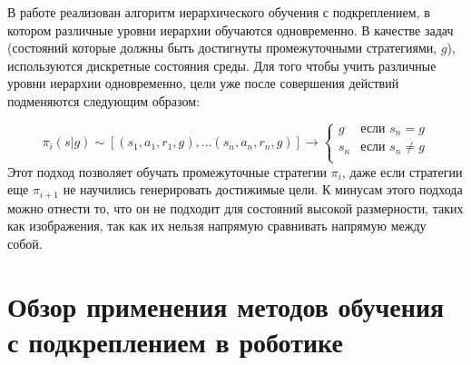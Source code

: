 В работе \cite{levy2017learning} реализован алгоритм иерархического обучения с подкреплением, в котором различные уровни иерархии обучаются одновременно. В качестве задач (состояний которые должны быть достигнуты промежуточными стратегиями, $g$), используются дискретные состояния среды. Для того чтобы учить различные уровни иерархии одновременно, цели уже после совершения действий подменяются следующим образом: 

\begin{equation}
    \pi_i(s|g) \sim [(s_1,a_1,r_1,g), \ldots (s_n,a_n,r_n,g)] \to \begin{cases}
        g & \text{если $s_n = g$}\\
        s_n & \text{если $s_n \neq g$}\\
    \end{cases}
\end{equation}
Этот подход позволяет обучать промежуточные стратегии $\pi_i$, даже если стратегии еще $\pi_{i+1}$ не научились генерировать достижимые цели. К минусам этого подхода можно отнести то, что он не подходит для состояний высокой размерности, таких как изображения, так как их нельзя напрямую сравнивать напрямую между собой. 




\section{Обзор применения методов обучения с подкреплением в роботике}\label{sec:ch1/sec2}

